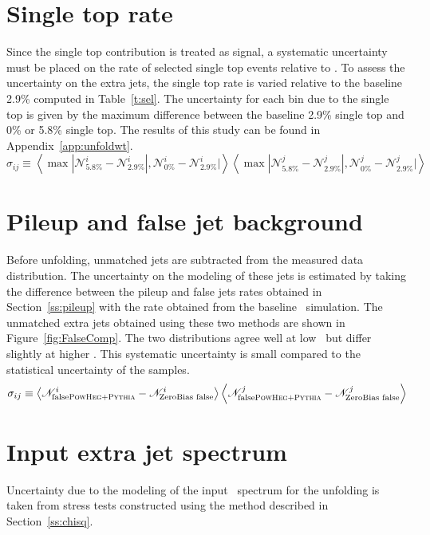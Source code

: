 \section{Single top rate}
\label{ss:wt}
Since the single top contribution is treated as signal, a systematic uncertainty must be placed on the rate of selected single top events relative to \ttbar.  To assess the uncertainty on the extra jets, the single top rate is varied relative to the baseline 2.9\% computed in Table~\ref{t:sel}. The uncertainty for each bin due to the single top is given by the maximum difference between the baseline 2.9\% single top and 0\% or 5.8\%  single top. The results of this study can be found in Appendix~\ref{app:unfoldwt}.
\begin{displaymath}
\sigma_{ij}\equiv \left \langle \max {|{\mathscr N}_{5.8\%}^i-{\mathscr N}_{2.9\%}^i|, {\mathscr N}_{0\%}^i-{\mathscr N}_{2.9\%}^i|} \right \rangle \left \langle \max {|{\mathscr N}_{5.8\%}^j-{\mathscr N}_{2.9\%}^j|, {\mathscr N}_{0\%}^j-{\mathscr N}_{2.9\%}^j|} \right \rangle
\end{displaymath}

\section{Pileup and false jet background}
\label{ss:sysbkg}
Before unfolding, unmatched jets are subtracted from the measured data distribution. The uncertainty on the modeling of these jets is estimated 
by taking the difference between the pileup and false jets rates obtained in Section~\ref{ss:pileup} with the
rate obtained from the baseline \powpy\ simulation.
The unmatched extra jets obtained using these two methods are shown in Figure~\ref{fig:FalseComp}. 
The two distributions agree well at low \pt\ but differ slightly at higher \pt. This systematic uncertainty is small compared to the statistical uncertainty of the samples.
\begin{displaymath}
\sigma_{ij} \equiv \left \langle {\mathscr N}^{i}_{\textrm{false} \textsc{PowHeg+Pythia} }-{\mathscr N}^{i}_{\textrm{ZeroBias~false}} \right \rangle \left \langle {\mathscr N}^{j}_{\textrm{false} \textsc{PowHeg+Pythia} }-{\mathscr N}^{j}_{\textrm{ZeroBias~false}} \right \rangle
\end{displaymath}
\section{Input extra jet spectrum}
\label{ss:unfsystt}
Uncertainty due to the modeling of the input \ttbar\ spectrum for the unfolding is taken from stress tests constructed using the method described in Section~\ref{ss:chisq}.

